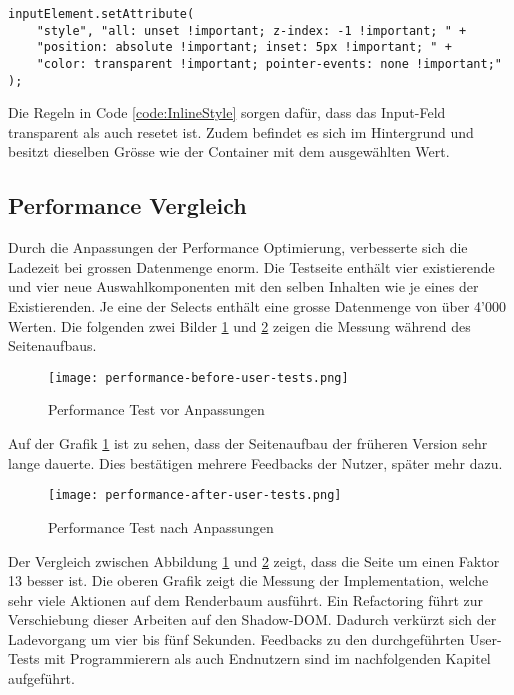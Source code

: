 \begin{lstlisting}[style = htmlcssjs, caption = Inline-Style für Inputfeld, label = code:InlineStyle]
inputElement.setAttribute(
    "style", "all: unset !important; z-index: -1 !important; " +
    "position: absolute !important; inset: 5px !important; " +
    "color: transparent !important; pointer-events: none !important;"
);
\end{lstlisting}

Die Regeln in Code \ref{code:InlineStyle} sorgen dafür, dass das Input-Feld transparent als auch resetet ist.
Zudem befindet es sich im Hintergrund und besitzt dieselben Grösse wie der Container mit dem ausgewählten Wert.

\subsection{Performance Vergleich}
\label{sec:performanceCompare}

Durch die Anpassungen der Performance Optimierung, verbesserte sich die Ladezeit bei grossen Datenmenge enorm.
Die Testseite enthält vier existierende und vier neue Auswahlkomponenten mit den selben Inhalten wie je eines der Existierenden.
Je eine der Selects enthält eine grosse Datenmenge von über 4'000 Werten.
Die folgenden zwei Bilder \ref{img:PerformanceTestBefore} und \ref{img:PerformanceTestAfter} zeigen die Messung während des Seitenaufbaus.

\begin{figure}[!htb]
    \centering
    \texttt{[image: performance-before-user-tests.png]}
    \caption{Performance Test vor Anpassungen}
    \label{img:PerformanceTestBefore}
\end{figure}

Auf der Grafik \ref{img:PerformanceTestBefore} ist zu sehen, dass der Seitenaufbau der früheren Version sehr lange dauerte.
Dies bestätigen mehrere Feedbacks der Nutzer, später mehr dazu.

\begin{figure}[!htb]
    \centering
    \texttt{[image: performance-after-user-tests.png]}
    \caption{Performance Test nach Anpassungen}
    \label{img:PerformanceTestAfter}
\end{figure}

Der Vergleich zwischen Abbildung \ref{img:PerformanceTestBefore} und \ref{img:PerformanceTestAfter} zeigt, dass die Seite um einen Faktor 13 besser ist.
Die oberen Grafik zeigt die Messung der Implementation, welche sehr viele Aktionen auf dem Renderbaum ausführt.
Ein Refactoring führt zur Verschiebung dieser Arbeiten auf den Shadow-DOM.
Dadurch verkürzt sich der Ladevorgang um vier bis fünf Sekunden.
Feedbacks zu den durchgeführten User-Tests mit Programmierern als auch Endnutzern sind im nachfolgenden Kapitel aufgeführt.


